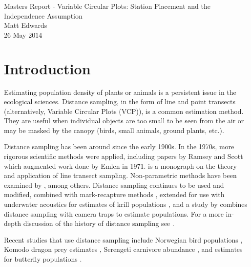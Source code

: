 \documentclass[12pt]{article}
\begin{document}
%
%
\begingroup  
  \centering
  \LARGE Masters Report - Variable Circular Plots: Station Placement and the Independence Assumption\\[1em]
  \large Matt Edwards\\
  26 May 2014\par
\endgroup

\section{Introduction}
Estimating population density of plants or animals is a persistent issue in the ecological sciences. Distance sampling, in the form of line and point transects (alternatively, Variable Circular Plots (VCP)), is a common estimation method. They are useful when individual objects are too small to be seen from the air or may be masked by the canopy (birds, small animals, ground plants, etc.).

Distance sampling has been around since the early 1900s. In the 1970s, more rigorous scientific methods were applied, including papers by Ramsey and Scott \parencite*{ramsey1979,ramsey1981} which augmented work done by Emlen in 1971. \cite{burnham1980} is a monograph on the theory and application of line transect sampling. Non-parametric methods have been examined by \textcite{quang1993,mack1998}, among others. Distance sampling continues to be used and modified, combined with mark-recapture methods \parencite{laake2011}, extended for use with underwater acoustics for estimates of krill populations \parencite{krill2011}, and a study by \textcite{camera2011} combines distance sampling with camera traps to estimate populations. For a more in-depth discussion of the history of distance sampling see \textcite{buckland2001}. 

Recent studies that use distance sampling include Norwegian bird populations \parencite{pedersen2012}, Komodo dragon prey estimates \parencite{komodo2013}, Serengeti carnivore abundance \parencite{serengeti2011}, and estimates for butterfly populations \parencite{butterfly2011}. 
\end{document}
